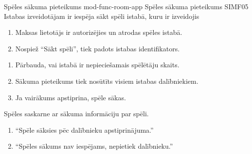 \moduleFunctionTable
{Spēles sākuma pieteikums}
{mod-func-room-app}
{Spēles sākuma pieteikums}
{SIMF05}
{
	Istabas izveidotājam ir iespēja sākt spēli istabā, kuru ir izveidojis
}
{
	\begin{enumerate}
		\item Maksas lietotājs ir autorizējies un atrodas spēles istabā.
		\item Nospiež ``Sākt spēli'', tiek padots istabas identifikators.
	\end{enumerate}
}
{
	\begin{enumerate}
		\item Pārbauda, vai istabā ir nepieciešamais spēlētāju skaits.
		\item Sākuma pieteikums tiek nosūtīts visiem istabas dalībniekiem.
		\item Ja vairākums apstiprina, spēle sākas.

	\end{enumerate}
}
{
	Spēles saskarne ar sākuma informāciju par spēli.
}
{
	\begin{enumerate}
		\item ``Spēle sāksies pēc dalībnieku apstiprinājuma.''
		\item ``Spēles sākums nav iespējams, nepietiek dalībnieku.''
	\end{enumerate}
}
